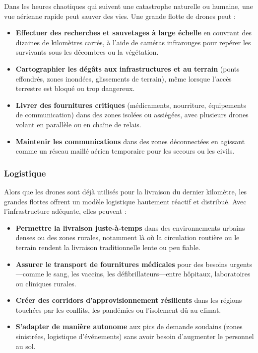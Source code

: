 \documentclass[a4paper,12pt]{article}
\begin{document}
Dans les heures chaotiques qui suivent une catastrophe naturelle ou humaine, une vue aérienne rapide peut sauver des vies. Une grande flotte de drones peut :
\begin{itemize}
    \item \textbf{Effectuer des recherches et sauvetages à large échelle} en couvrant des dizaines de kilomètres carrés, à l’aide de caméras infrarouges pour repérer les survivants sous les décombres ou la végétation.
    \item \textbf{Cartographier les dégâts aux infrastructures et au terrain} (ponts effondrés, zones inondées, glissements de terrain), même lorsque l’accès terrestre est bloqué ou trop dangereux.
    \item \textbf{Livrer des fournitures critiques} (médicaments, nourriture, équipements de communication) dans des zones isolées ou assiégées, avec plusieurs drones volant en parallèle ou en chaîne de relais.
    \item \textbf{Maintenir les communications} dans des zones déconnectées en agissant comme un réseau maillé aérien temporaire pour les secours ou les civils.
\end{itemize}

\subsubsection*{Logistique}

Alors que les drones sont déjà utilisés pour la livraison du dernier kilomètre, les grandes flottes offrent un modèle logistique hautement réactif et distribué. Avec l’infrastructure adéquate, elles peuvent :
\begin{itemize}
    \item \textbf{Permettre la livraison juste-à-temps} dans des environnements urbains denses ou des zones rurales, notamment là où la circulation routière ou le terrain rendent la livraison traditionnelle lente ou peu fiable.
    \item \textbf{Assurer le transport de fournitures médicales} pour des besoins urgents—comme le sang, les vaccins, les défibrillateurs—entre hôpitaux, laboratoires ou cliniques rurales.
    \item \textbf{Créer des corridors d’approvisionnement résilients} dans les régions touchées par les conflits, les pandémies ou l’isolement dû au climat.
    \item \textbf{S’adapter de manière autonome} aux pics de demande soudains (zones sinistrées, logistique d’événements) sans avoir besoin d’augmenter le personnel au sol.
\end{itemize}
\end{document}
